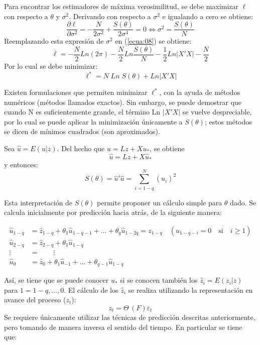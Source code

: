 Para encontrar los estimadores de m\'{a}xima verosimilitud, se debe maximizar $\ell$ con respecto a $\theta$ y $\sigma^{2}$. Derivando con respecto a $\sigma^{2}$ e igualando a cero se obtiene:
\[
\frac{\partial \ell }{\partial \sigma^{2}}=-\frac{N}{2\sigma^{2}}+\frac{S(\theta )}{2\sigma^{4}}=0\Leftrightarrow \sigma^{2}=\frac{S(\theta )}{N}
\]
Reemplazando esta expresi\'{o}n de $\sigma^{2}$ en (\ref{ecua:08}) se obtiene:
\[
\overline{\ell} =-\frac{N}{2}Ln(2\pi)-\frac{N}{2}Ln\frac{S(\theta )}{N}-\frac{1}{2}Ln\left| {X'X} \right|-\frac{N}{2}
\]
Por lo cual se debe minimizar:
\[
\ell^{\ast}=N\;Ln\;S(\theta )+Ln\left| {X'X} \right|
\]

Existen formulaciones que permiten minimizar $\ell^{\ast}$, con la ayuda de m\'{e}todos num\'{e}ricos (m\'{e}todos llamados exactos). Sin embargo, se puede demostrar que cuando N es suficientemente grande, el t\'{e}rmino Ln $\left| {X'X} \right|$ se vuelve despreciable, por lo cual se puede aplicar la minimizaci\'{o}n \'{u}nicamente a $S(\theta)$; estos m\'{e}todos se dicen de m\'{i}nimos cuadrados (son aproximados).\newline

Sea $\hat{u}=E(u|z)$. Del hecho que $u=Lz+Xu_{\ast}$, se obtiene
\[
\hat{u} = Lz+X\hat{u}_{\ast} 
\]
y entonces:
\[
S(\theta) = \hat{u}'\hat{u} = \sum_{i=1-q}^N (\hat{u}_{i})^{2}
\]

Esta interpretaci\'{o}n de $S(\theta)$ permite proponer un c\'{a}lculo simple para $\theta$ dado. Se calcula inicialmente por predicci\'{o}n hacia atr\'{a}s, de la siguiente manera:

\begin{align*}
\hat{u}_{1-q} &= \hat{z}_{1-q} +\theta_{1} \hat{u}_{1-q-1} +\ldots +\theta_{q} \hat{u}_{1-2q} =z_{1-q} \quad (\hat{u}_{1-q-i} =0\quad \text{si}\quad i\geq 1)\\
\hat{u}_{2-q} &= \hat{z}_{2-q} +\theta_{1} \hat{u}_{1-q}\\
\vdots &= \qquad \vdots\\
\hat{u}_{0} &= \hat{z}_{0} +\theta_{1} \hat{u}_{-1} +\ldots +\theta_{q-1} \hat{u}_{1-q}
\end{align*}

As\'{i}, se tiene que se puede conocer $u_{\ast}$ si se conocen tambi\'{e}n los $\hat{z}_{i} =E(z_{i} | z)$ para $1=1-q,\ldots,0$. El c\'{a}lculo de los $\hat{z}_{i}$ se realiza utilizando la representaci\'{o}n en avance del proceso ($z_{t}$):
\[
z_{t} =\Theta \,(F)\varepsilon_{t} 
\]
Se requiere \'{u}nicamente utilizar las t\'{e}cnicas de predicci\'{o}n descritas anteriormente, pero tomando de manera inversa el sentido del tiempo. En particular se tiene que:

